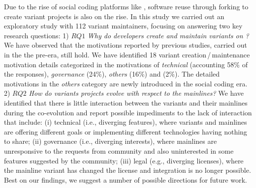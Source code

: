 Due to the rise of social coding platforms like \gh, software reuse through forking to create variant projects is also on the rise. 
In this study we carried out an exploratory study with 112 variant maintainers, focusing on answering two key research questions: 1) $RQ1$ \textit{Why do developers create and maintain variants on \gh?}  
We have observed that the motivations reported by previous studies, carried out in the the pre-\gh era, still hold. We have identified 18 variant creation\,/\,maintenance motivation details categorized in the motivations of \emph{technical} (accounting 58\% of the responses), \emph{governance} (24\%), \emph{others} (16\%) and  (2\%). The detailed motivations in the \emph{others} category are newly introduced in the social coding era. 
2) $RQ2$ \textit{How do variants projects evolve with respect to the mainlines?}
We have identified that there is little interaction between the variants and their mainlines during the co-evolution and report possible impediments to the lack of interaction that include: (i) technical (i.e., diverging features), where variants and mainlines are offering different goals or implementing different technologies having nothing to share; (ii) governance (i.e., diverging interests), where mainlines are unresponsive to the requests from community and also uninterested in some features suggested by the community; (iii) legal (e.g., diverging licenses), where the mainline variant has changed the license and integration is no longer possible. Best on our findings, we suggest a number of possible directions for future work. 

